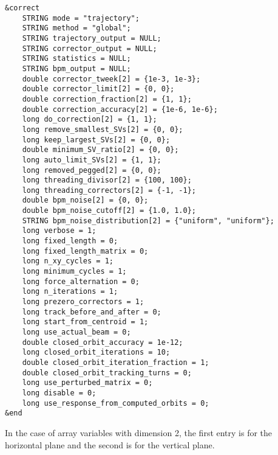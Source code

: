 \documentclass[11pt]{article}
\begin{document}
\begin{verbatim}
&correct
    STRING mode = "trajectory";
    STRING method = "global";
    STRING trajectory_output = NULL;
    STRING corrector_output = NULL;
    STRING statistics = NULL;
    STRING bpm_output = NULL;
    double corrector_tweek[2] = {1e-3, 1e-3};
    double corrector_limit[2] = {0, 0};
    double correction_fraction[2] = {1, 1};
    double correction_accuracy[2] = {1e-6, 1e-6};
    long do_correction[2] = {1, 1};
    long remove_smallest_SVs[2] = {0, 0};
    long keep_largest_SVs[2] = {0, 0};
    double minimum_SV_ratio[2] = {0, 0};
    long auto_limit_SVs[2] = {1, 1};
    long removed_pegged[2] = {0, 0};
    long threading_divisor[2] = {100, 100};
    long threading_correctors[2] = {-1, -1};
    double bpm_noise[2] = {0, 0};
    double bpm_noise_cutoff[2] = {1.0, 1.0};
    STRING bpm_noise_distribution[2] = {"uniform", "uniform"};
    long verbose = 1;
    long fixed_length = 0;
    long fixed_length_matrix = 0;
    long n_xy_cycles = 1;
    long minimum_cycles = 1;
    long force_alternation = 0;
    long n_iterations = 1;
    long prezero_correctors = 1;
    long track_before_and_after = 0;
    long start_from_centroid = 1;
    long use_actual_beam = 0;
    double closed_orbit_accuracy = 1e-12;
    long closed_orbit_iterations = 10;
    double closed_orbit_iteration_fraction = 1;
    double closed_orbit_tracking_turns = 0;
    long use_perturbed_matrix = 0;
    long disable = 0;
    long use_response_from_computed_orbits = 0;
&end
\end{verbatim}

In the case of array variables with dimension 2, the first entry is for the horizontal plane and the second
is for the vertical plane.
\end{document}
